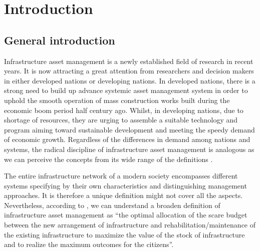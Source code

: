 
\chapter{Introduction} %
\label{Chapter1}
\section{General introduction}
Infrastructure asset management is a newly established field of research in recent years. It is now attracting a great attention from researchers and decision makers  in either developed nations or developing nations. In developed nations, there is a strong need to build up advance systemic asset management system in order to uphold the smooth operation of mass construction works built during the economic boom period half century ago. Whilst, in developing nations, due to shortage of resources, they are urging to assemble a suitable technology and program aiming toward sustainable development and meeting the speedy demand of economic growth. Regardless of the differences in demand among nations and systems, the radical discipline of infrastructure asset management is analogous as we can perceive the concepts from its wide range of the definitions \cite{kcleong}.

The entire infrastructure network of a modern society encompasses different systems specifying by their own characteristics and distinguishing management approaches. It is therefore a unique definition might not cover all the aspects. Nevertheless, according to \citet{kobaasset}, we can understand a broaden definition of infrastructure asset management as ``the optimal allocation of the scare budget between the new arrangement of infrastructure and rehabilitation/maintenance of the existing infrastructure to maximize the value of the stock of infrastructure and to realize the maximum outcomes for the citizens''.
%

